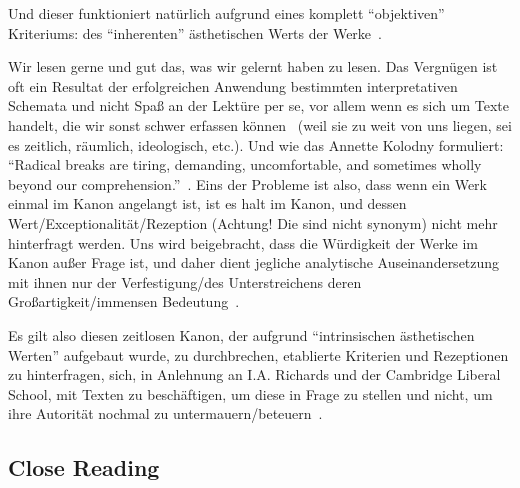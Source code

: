 Und dieser funktioniert natürlich aufgrund eines komplett ``objektiven'' Kriteriums: des ``inherenten'' ästhetischen Werts der Werke~\autocite{North2013}.

Wir lesen gerne und gut das, was wir gelernt haben zu lesen.
Das Vergnügen ist oft ein Resultat der erfolgreichen Anwendung bestimmten interpretativen Schemata und nicht Spaß an der Lektüre per se, vor allem wenn es sich um Texte handelt, die wir sonst schwer erfassen können~\autocite{Kolodny1980} (weil sie zu weit von uns liegen, sei es zeitlich, räumlich, ideologisch, etc.).
Und wie das Annette Kolodny formuliert:
``Radical breaks are tiring, demanding, uncomfortable, and sometimes wholly beyond our comprehension.''~\autocite{Kolodny1980}.
Eins der Probleme ist also, dass wenn ein Werk einmal im Kanon angelangt ist, ist es halt im Kanon, und dessen Wert/Exceptionalität/Rezeption (Achtung! Die sind nicht synonym) nicht mehr hinterfragt werden.
Uns wird beigebracht, dass die Würdigkeit der Werke im Kanon außer Frage ist,
und daher dient jegliche analytische Auseinandersetzung mit ihnen nur der Verfestigung/des Unterstreichens deren Großartigkeit/immensen Bedeutung~\autocite{Kolodny1980}.

Es gilt also diesen zeitlosen Kanon, der aufgrund ``intrinsischen ästhetischen Werten'' aufgebaut wurde, zu durchbrechen, etablierte Kriterien und Rezeptionen zu hinterfragen, %
sich, in Anlehnung an I.A. Richards und der Cambridge Liberal School, mit Texten zu beschäftigen, um diese in Frage zu stellen und nicht, um ihre Autorität nochmal zu untermauern/beteuern~\autocite{North2013}.


\subsection{Close Reading}

